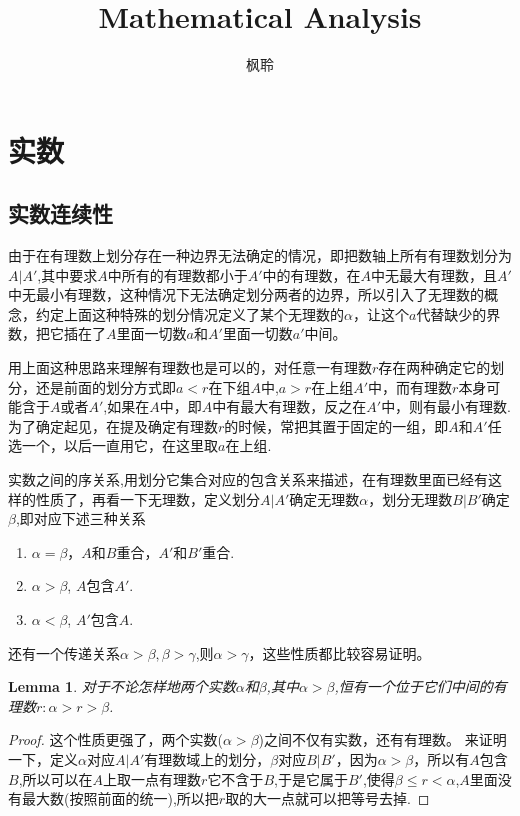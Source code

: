 \documentclass{article}
\newtheorem{lemma}[theorem]{Lemma}
\begin{document}
\title{Mathematical Analysis}
\author{枫聆}
\maketitle
\tableofcontents

\newpage
\section{实数}
\subsection{实数连续性}

由于在有理数上划分存在一种边界无法确定的情况，即把数轴上所有有理数划分为$A|A'$,其中要求$A$中所有的有理数都小于$A'$中的有理数，在$A$中无最大有理数，且$A'$中无最小有理数，这种情况下无法确定划分两者的边界，所以引入了无理数的概念，约定上面这种特殊的划分情况定义了某个无理数的$\alpha$，让这个$a$代替缺少的界数，把它插在了$A$里面一切数$a$和$A'$里面一切数$a'$中间。

用上面这种思路来理解有理数也是可以的，对任意一有理数$r$存在两种确定它的划分，还是前面的划分方式即$a < r$在下组$A$中,$a > r$在上组$A'$中，而有理数$r$本身可能含于$A$或者$A'$,如果在$A$中，即$A$中有最大有理数，反之在$A'$中，则有最小有理数.为了确定起见，在提及确定有理数$r$的时候，常把其置于固定的一组，即$A$和$A'$任选一个，以后一直用它，在这里取$a$在上组.

实数之间的序关系,用划分它集合对应的包含关系来描述，在有理数里面已经有这样的性质了，再看一下无理数，定义划分$A|A'$确定无理数$\alpha$，划分无理数$B|B'$确定$\beta$,即对应下述三种关系

\begin{enumerate}
	\item  $\alpha = \beta$，$A$和$B$重合，$A'$和$B'$重合.
	\item  $\alpha > \beta$, $A$包含$A'$.
	\item  $\alpha < \beta$, $A'$包含$A$.
\end{enumerate}

还有一个传递关系$\alpha > \beta , \beta > \gamma$,则$\alpha > \gamma$，这些性质都比较容易证明。

\begin{lemma}
对于不论怎样地两个实数$\alpha$和$\beta$,其中$\alpha > \beta$,恒有一个位于它们中间的有理数$r \colon \alpha > r > \beta$.
\end{lemma}

\begin{proof}
这个性质更强了，两个实数($\alpha > \beta$)之间不仅有实数，还有有理数。 来证明一下，定义$\alpha$对应$A|A'$有理数域上的划分，$\beta$对应$B|B'$，因为$\alpha > \beta$，所以有$A$包含$B$,所以可以在$A$上取一点有理数$r$它不含于$B$,于是它属于$B'$,使得$\beta \leq r<\alpha$,$A$里面没有最大数(按照前面的统一),所以把$r$取的大一点就可以把等号去掉.
\end{proof}
\end{document}
